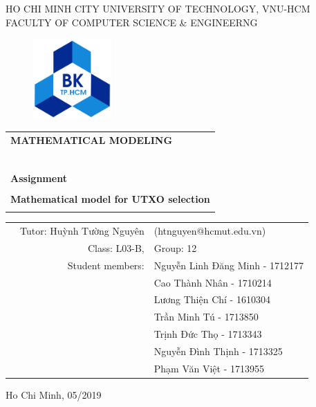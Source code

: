 \documentclass[a4paper]{article}
\begin{document}
\begin{titlepage}

\begin{center}
HO CHI MINH CITY UNIVERSITY OF TECHNOLOGY, VNU-HCM\\
FACULTY OF COMPUTER SCIENCE \& ENGINEERNG
\end{center}

\vspace{1cm}

\begin{figure}[h!]
\begin{center}
\includegraphics[width=3cm]{hcmut.png}
\end{center}
\end{figure}

\vspace{1cm}


\begin{center}
\begin{tabular}{c}
\multicolumn{1}{l}{\textbf{{\Large MATHEMATICAL MODELING}}}\\
~~\\
\hline
\\
\multicolumn{1}{l}{\textbf{{\Large Assignment}}}\\
\\
\textbf{\Huge Mathematical model for UTXO selection}\\
\\
\hline
\end{tabular}
\end{center}

\vspace{3cm}

\begin{table}[h]
\begin{tabular}{rrl}

\hspace{5 cm} & Tutor: Huỳnh Tường Nguyên & (htnguyen@hcmut.edu.vn)\\
& Class: L03-B, & Group: 12\\
& Student members: & Nguyễn Linh Đăng Minh - 1712177 \\
& & Cao Thành Nhân - 1710214 \\
& & Lương Thiện Chí - 1610304 \\
& & Trần Minh Tú - 1713850 \\
& & Trịnh Đức Thọ - 1713343 \\
& & Nguyễn Đình Thịnh - 1713325 \\
& & Phạm Văn Việt - 1713955 \\
\end{tabular}
\end{table}

\begin{center}
{\footnotesize Ho Chi Minh, 05/2019}
\end{center}
\end{titlepage}
\end{document}
